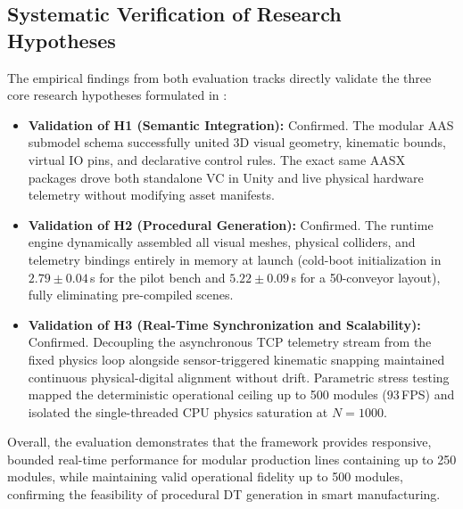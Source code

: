 \subsection{Systematic Verification of Research Hypotheses}

The empirical findings from both evaluation tracks directly validate the three core research hypotheses formulated in :

\begin{itemize}
    \item \textbf{Validation of H1 (Semantic Integration):} Confirmed. The modular \gls{AAS} submodel schema successfully united 3D visual geometry, kinematic bounds, virtual \gls{IO} pins, and declarative control rules. The exact same \gls{AASX} packages drove both standalone \gls{VC} in Unity and live physical hardware telemetry without modifying asset manifests.
    \item \textbf{Validation of H2 (Procedural Generation):} Confirmed. The runtime engine dynamically assembled all visual meshes, physical colliders, and telemetry bindings entirely in memory at launch (cold-boot initialization in $2.79 \pm 0.04\,$s for the pilot bench and $5.22 \pm 0.09\,$s for a 50-conveyor layout), fully eliminating pre-compiled scenes.
    \item \textbf{Validation of H3 (Real-Time Synchronization and Scalability):} Confirmed. Decoupling the asynchronous \gls{TCP} telemetry stream from the fixed physics loop alongside sensor-triggered kinematic snapping maintained continuous physical-digital alignment without drift. Parametric stress testing mapped the deterministic operational ceiling up to 500 modules ($93\,$\gls{FPS}) and isolated the single-threaded \gls{CPU} physics saturation at $N=1000$.
\end{itemize}

Overall, the evaluation demonstrates that the framework provides responsive, bounded real-time performance for modular production lines containing up to 250 modules, while maintaining valid operational fidelity up to 500 modules, confirming the feasibility of procedural \gls{DT} generation in smart manufacturing.